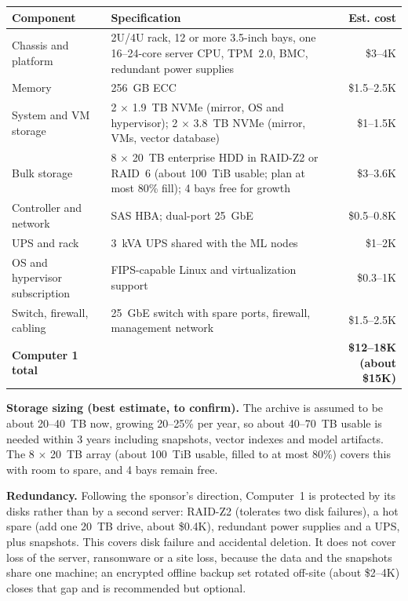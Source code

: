 

{\footnotesize
\begin{xltabular}{\textwidth}{@{}Y{0.621}Y{1.379}r@{}}
  \toprule
  Component & Specification & Est. cost \\
  \midrule
  \endhead
  Chassis and platform & 2U/4U rack, 12 or more 3.5-inch bays, one 16--24-core server CPU, TPM~2.0, BMC, redundant power supplies & \$3--4K \\
  Memory & 256~GB ECC & \$1.5--2.5K \\
  System and VM storage & 2 $\times$ 1.9~TB NVMe (mirror, OS and hypervisor); 2 $\times$ 3.8~TB NVMe (mirror, VMs, vector database) & \$1--1.5K \\
  Bulk storage & 8 $\times$ 20~TB enterprise HDD in RAID-Z2 or RAID~6 (about 100~TiB usable; plan at most 80\% fill); 4 bays free for growth & \$3--3.6K \\
  Controller and network & SAS HBA; dual-port 25~GbE & \$0.5--0.8K \\
  UPS and rack & 3~kVA UPS shared with the ML nodes & \$1--2K \\
  OS and hypervisor subscription & FIPS-capable Linux and virtualization support & \$0.3--1K \\
  Switch, firewall, cabling & 25~GbE switch with spare ports, firewall, management network & \$1.5--2.5K \\
  \midrule
  \textbf{Computer 1 total} & & \textbf{\$12--18K (about \$15K)} \\
  \bottomrule
\end{xltabular}}

\textbf{Storage sizing (best estimate, to confirm).} The archive is assumed to be about
20--40~TB now, growing 20--25\% per year, so about 40--70~TB usable is needed within 3
years including snapshots, vector indexes and model artifacts. The 8 $\times$ 20~TB array
(about 100~TiB usable, filled to at most 80\%) covers this with room to spare, and 4
bays remain free.

\textbf{Redundancy.} Following the sponsor's direction, Computer~1 is protected by its
disks rather than by a second server: RAID-Z2 (tolerates two disk failures), a hot spare
(add one 20~TB drive, about \$0.4K), redundant power supplies and a UPS, plus snapshots.
This covers disk failure and accidental deletion. It does not cover loss of the server,
ransomware or a site loss, because the data and the snapshots share one machine; an
encrypted offline backup set rotated off-site (about \$2--4K) closes that gap and is
recommended but optional.

